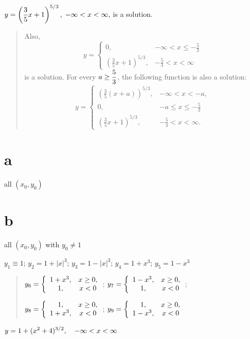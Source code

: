 $\displaystyle{y=\left(\frac{3}{5}
x+1\right)^{5/3},\;-\infty<x<\infty,}$ is a solution.
\begin{quote}Also,
$$
y=
\left\{
\begin{array}{cl}
0,&-\infty<x\le-\frac{5}{3}\\[3pt]
\left(\frac{3}{5}x+1\right)^{5/3},&-\frac{5}{3}<x<\infty
\end{array}\right.
$$
is a solution.
For every $\displaystyle{a\ge\frac{5}{3}}$, the following function is also a
solution:
$$
y=
\left\{
\begin{array}{cl}
\left(\frac{3}{5}(x+a)\right)^{5/3},&-\infty<x<-a,\\[3pt]
0,&-a\le x\le-\frac{5}{3}\\[3pt]
\left(\frac{3}{5}x+1\right)^{5/3},&-\frac{5}{3}<x<\infty.
\end{array}\right.
$$ \end{quote}

  \part{a} all $(x_{0},y_{0})$  \part{b}
all $(x_{0},y_{0})$ with $y_{0}\ne1$

$y_{1}\equiv1$;   $y_{2}=1+|x|^{3}$;   $y_{3}=1-|x|^{3}$;   $y_{4}=1+x^{3}$;
$y_{5}=1-x^{3}$
\begin{quote}
$y_{6}=\displaystyle{\left\{\begin{array}{ccl}1+x^{3},&x\ge0,\\
1,&x<0\end{array}\right.}$;  \quad
$y_{7}=\displaystyle{\left\{\begin{array}{ccl}1-x^{3},&x\ge0,\\
1,&x<0\end{array}\right.}$;

$y_{8}=\displaystyle{\left\{\begin{array}{ccl}1,&x\ge0,\\
1+x^{3},&x<0\end{array}\right.}$;  \quad
$y_{9}=\displaystyle{\left\{\begin{array}{ccl}1,&x\ge0,\\
1-x^{3},&x<0\end{array}\right.}$\end{quote}

$\displaystyle{y=1+(x^{2}+4)^{3/2},\quad-\infty<x<\infty}$

